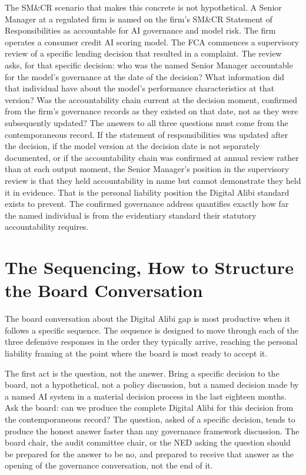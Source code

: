 The SM\&CR scenario that makes this concrete is not hypothetical. A Senior Manager at a regulated firm is named on the firm's SM\&CR Statement of Responsibilities as accountable for AI governance and model risk. The firm operates a consumer credit AI scoring model. The FCA commences a supervisory review of a specific lending decision that resulted in a complaint. The review asks, for that specific decision: who was the named Senior Manager accountable for the model's governance at the date of the decision? What information did that individual have about the model's performance characteristics at that version? Was the accountability chain current at the decision moment, confirmed from the firm's governance records as they existed on that date, not as they were subsequently updated? The answers to all three questions must come from the contemporaneous record. If the statement of responsibilities was updated after the decision, if the model version at the decision date is not separately documented, or if the accountability chain was confirmed at annual review rather than at each output moment, the Senior Manager's position in the supervisory review is that they held accountability in name but cannot demonstrate they held it in evidence. That is the personal liability position the Digital Alibi standard exists to prevent. The confirmed governance address quantifies exactly how far the named individual is from the evidentiary standard their statutory accountability requires.

\scenebreak

\section{The Sequencing, How to Structure the Board Conversation}

The board conversation about the Digital Alibi gap is most productive when it follows a specific sequence. The sequence is designed to move through each of the three defensive responses in the order they typically arrive, reaching the personal liability framing at the point where the board is most ready to accept it.

The first act is the question, not the answer. Bring a specific decision to the board, not a hypothetical, not a policy discussion, but a named decision made by a named AI system in a material decision process in the last eighteen months. Ask the board: can we produce the complete Digital Alibi for this decision from the contemporaneous record? The question, asked of a specific decision, tends to produce the honest answer faster than any governance framework discussion. The board chair, the audit committee chair, or the NED asking the question should be prepared for the answer to be no, and prepared to receive that answer as the opening of the governance conversation, not the end of it.

